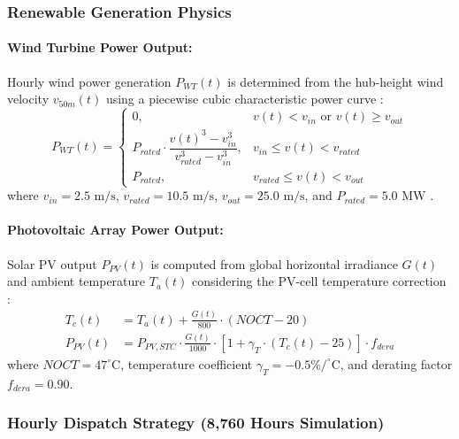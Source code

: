 \documentclass[review]{elsarticle}
\begin{document}
\subsubsection{Renewable Generation Physics}

\paragraph{Wind Turbine Power Output:}
Hourly wind power generation $P_{WT}(t)$ is determined from the hub-height wind velocity $v_{50m}(t)$ using a piecewise cubic characteristic power curve \cite{su2023capacity}:
\begin{equation}
P_{WT}(t) = \begin{cases}
0, & v(t) < v_{in} \text{ or } v(t) \ge v_{out} \\
P_{rated} \cdot \dfrac{v(t)^3 - v_{in}^3}{v_{rated}^3 - v_{in}^3}, & v_{in} \le v(t) < v_{rated} \\
P_{rated}, & v_{rated} \le v(t) < v_{out}
\end{cases}
\label{eq:wind_power_curve}
\end{equation}
where $v_{in} = 2.5\text{ m/s}$, $v_{rated} = 10.5\text{ m/s}$, $v_{out} = 25.0\text{ m/s}$, and $P_{rated} = 5.0\text{ MW}$ \cite{li2024capacity}.

\paragraph{Photovoltaic Array Power Output:}
Solar PV output $P_{PV}(t)$ is computed from global horizontal irradiance $G(t)$ and ambient temperature $T_a(t)$ considering the PV-cell temperature correction \cite{smaoui2015optimal}:
\begin{align}
T_c(t) &= T_a(t) + \frac{G(t)}{800} \cdot (NOCT - 20) \label{eq:pv_cell_temp} \\
P_{PV}(t) &= P_{PV,STC} \cdot \frac{G(t)}{1000} \cdot \left[ 1 + \gamma_T \cdot (T_c(t) - 25) \right] \cdot f_{dera} \label{eq:pv_power_output}
\end{align}
where $NOCT = 47^\circ\text{C}$, temperature coefficient $\gamma_T = -0.5\%/^\circ\text{C}$, and derating factor $f_{dera} = 0.90$.

\subsubsection{Hourly Dispatch Strategy (8,760 Hours Simulation)}
\end{document}
